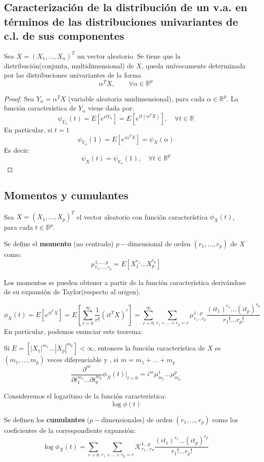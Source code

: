 \subsection{Caracterización de la distribución de un v.a. en términos de las distribuciones univariantes de c.l. de sus componentes}

\begin{nth}
  Sea $X = (X_1,\dots, X_n)^T$ un vector aleatorio. Se tiene que la distribución(conjunta, multidimensional) de $X$, queda unívocamente determinada por las distribuciones univariantes de la forma
  \[
\alpha ^T X, \quad \quad \forall \alpha \in \mathbb R ^p
  \]
\end{nth}
\begin{proof}
  Sea $Y_\alpha = \alpha^T X$ (variable aleatoria unidimensional), para cada $\alpha \in \mathbb R^p$. La función característica de $Y_\alpha$ viene dada por:
  \[
  \psi_{Y_\alpha}(t) = E[e^{itY_\alpha}] = E [e^{it(\alpha^T X)}], \quad \forall t \in \mathbb R
  \]
  En particular, si $t=1$
  \[
  \psi_{Y_\alpha}(1) = E[e^{i\alpha^T X}] = \psi_X (\alpha)
  \]
  Es decir:
  \[
  \psi_X(t) = \psi_{Y_\alpha}(1), \quad \forall t \in \mathbb R ^p
  \]
\end{proof}

\subsection{Momentos y cumulantes}

Sea $X= (X_1,\dots,X_p)^T$ el vector aleatorio con función característica $\phi_X(t)$, para cada $t\in \mathbb R^p$.
\begin{ndef}
  Se define el \textbf{momento} (no centrado) $p-$dimensional de orden $(r_1, \dots, r_p)$ de $X$ como:
  \[
\mu_{r_1,\dots,r_p}^{1,\dots,p} = E [ X_1^{r_1} \dots X_p^{r_p}]
  \]
\end{ndef}

Los momentos se pueden obtener a partir de la función característica derivándose de su expansión de Taylor(respecto al origen).

\[
\phi_X(t) = E[e^{it^T X}] = E[\sum_{r=0}^\infty \frac{1}{r!}(i t^T X)^r] = \sum_{r= 0}^\infty \sum _{r_1+\dots + r_p = r} \mu_{r_1 \dots r_p}^{1 \dots p} \frac{(it_1)^{r_1} \dots (it_p)^{r_p}}{r_1 ! \dots r_p !}
\]
En particular, podemos enunciar este teorema:
\begin{nth}
  Si $E=[|X_1|^{m_1} \dots |X_p|^{m_p}] < \infty$, entonces la función característica de $X$ es $(m_1, \dots, m_p)$ veces diferenciable y , si $m = m_1 + \dots + m_p$
  \[
\frac{\partial ^m}{\partial t_1^{m_1} \dots \partial t_p^{m_p}} \phi_X(t)| _{t = 0} = i^m \mu_{m_1}^1 \dots \mu_{m_p}^p
  \]
\end{nth}

Consideremos el logaritmo de la función característica:
\[
\log \phi(t)
\]
\begin{ndef}
  Se definen los \textbf{cumulantes} ($p-$dimensionales) de orden $(r_1 , \dots, r_p)$ como los coeficientes de la correspondiente expansión:
  \[
  \log \phi_X(t) =  \sum_{r= 0} \sum_{r_1+\dots + r_p = r} \mathcal K_{r_1 \dots r_P}^{1\dots p} \frac{(it_1)^{r_1} \dots (it_p)^{r_p}}{r_1 ! \dots r_p !}
  \]
\end{ndef}
